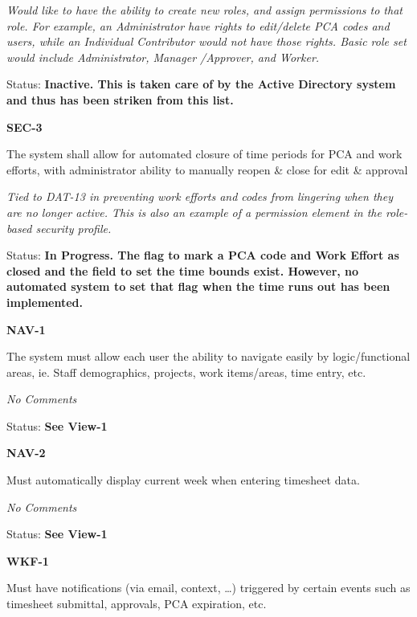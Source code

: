 \noindent \textit{Would like to have the ability to create new roles, and assign permissions to that role. For example, an Administrator have rights to edit/delete PCA codes and users, while an Individual Contributor would not have those rights. Basic role set would include Administrator, Manager /Approver, and Worker.}

\noindent Status: \textbf{Inactive.  This is taken care of by the Active Directory system and thus has been striken from this list.}\\

\noindent 

\noindent \textbf{SEC-3}

\noindent The system shall allow for automated closure of time periods for PCA and work efforts, with administrator ability to manually reopen \& close for edit \& approval

\noindent \textit{Tied to DAT-13 in preventing work efforts and codes from lingering when they are no longer active. This is also an example of a permission element in the role-based security profile.}

\noindent Status: \textbf{In Progress.  The flag to mark a PCA code and Work Effort as closed and the field to set the time bounds exist.  However, no automated system to set that flag when the time runs out has been implemented.}\\

\noindent 

\noindent \textbf{NAV-1}

\noindent The system must allow each user the ability to navigate easily by logic/functional areas, ie. Staff demographics, projects, work items/areas, time entry, etc.

 \textit{No Comments}

Status: \textbf{See View-1}\textit{}\\

\noindent 

\noindent \textbf{NAV-2}

\noindent Must automatically display current week when entering timesheet data.

 \textit{No Comments }

\textit{ }Status: \textbf{See View-1}\textit{}\\

\noindent 

\noindent \textbf{WKF-1}

\noindent Must have notifications (via email, context, \dots ) triggered by certain events such as timesheet submittal, approvals, PCA expiration, etc.


